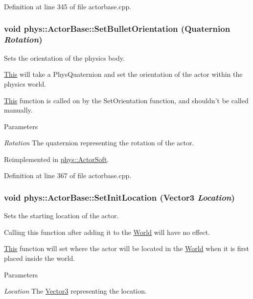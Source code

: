 Definition at line 345 of file actorbase.cpp.

\hypertarget{classphys_1_1ActorBase_a492244ac46ced53b809f436da992bc84}{
\subsubsection[{SetBulletOrientation}]{\setlength{\rightskip}{0pt plus 5cm}void phys::ActorBase::SetBulletOrientation ({\bf Quaternion} {\em Rotation})}}
\label{d8/d0f/classphys_1_1ActorBase_a492244ac46ced53b809f436da992bc84}


Sets the orientation of the physics body. 

\hyperlink{structThis}{This} will take a PhysQuaternion and set the orientation of the actor within the physics world. \par
 \hyperlink{structThis}{This} function is called on by the SetOrientation function, and shouldn't be called manually. 
\begin{DoxyParams}{Parameters}
\item[{\em Rotation}]The quaternion representing the rotation of the actor. \end{DoxyParams}


Reimplemented in \hyperlink{classphys_1_1ActorSoft_a4a1119b6e42ff11784673657e7d62c1f}{phys::ActorSoft}.



Definition at line 367 of file actorbase.cpp.

\hypertarget{classphys_1_1ActorBase_a0ff0980bcf33a8205eb058b8caa1f36b}{
\subsubsection[{SetInitLocation}]{\setlength{\rightskip}{0pt plus 5cm}void phys::ActorBase::SetInitLocation ({\bf Vector3} {\em Location})}}
\label{d8/d0f/classphys_1_1ActorBase_a0ff0980bcf33a8205eb058b8caa1f36b}


Sets the starting location of the actor. 

Calling this function after adding it to the \hyperlink{classphys_1_1World}{World} will have no effect. \par
 \hyperlink{structThis}{This} function will set where the actor will be located in the \hyperlink{classphys_1_1World}{World} when it is first placed inside the world. 
\begin{DoxyParams}{Parameters}
\item[{\em Location}]The \hyperlink{classphys_1_1Vector3}{Vector3} representing the location. \end{DoxyParams}


